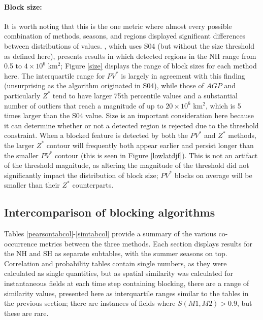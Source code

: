 \documentclass[smallextended]{svjour3}       %
\numberwithin{equation}{section}
\begin{document}
\paragraph{Block size:} {\color{blue}It is worth noting that this is the one metric where almost every possible combination of methods, seasons, and regions displayed significant differences between distributions of values.} \cite{croci-maspoli_multifaceted_2007}, which uses S04 (but without the size threshold as defined here), presents results in which detected regions in the NH range from 0.5 to $4\times 10^6$ km$^2$; Figure \ref{size} displays the range of block sizes for each method here. The interquartile range for $PV^*$ is largely in agreement with this finding (unsurprising as the algorithm originated in S04), while those of $AGP$ and particularly $Z^*$ tend to have larger 75th percentile values and a substantial number of outliers that reach a magnitude of up to $20\times 10^6$ km$^2$, which is 5 times larger than the S04 value. Size is an important consideration here because it can determine whether or not a detected region is rejected due to the threshold constraint. When a blocked feature is detected by both the $PV^*$ and $Z^*$ methods, the larger $Z^*$ contour will frequently both appear earlier and persist longer than the smaller $PV^*$ contour (this is seen in Figure \ref{lowlatdjf}). This is not an artifact of the threshold magnitude, as altering the magnitude of the threshold did not significantly impact the distribution of block size; $PV^*$ blocks on average will be smaller than their $Z^*$ counterparts.

\subsection{Intercomparison of blocking algorithms}\label{intercompare}

Tables \ref{pearsontabcol}-\ref{simtabcol} provide a summary of the various co-occurrence metrics between the three methods. Each section displays results for the NH and SH as separate subtables, with the summer seasons on top. Correlation and probability tables contain single numbers, as they were calculated as single quantities, but as spatial similarity was calculated for instantaneous fields at each time step containing blocking, there are a range of similarity values, presented here as interquartile ranges similar to the tables in the previous section; there are instances of fields where $S(M1,M2)>0.9$, but these are rare. 
\end{document}
